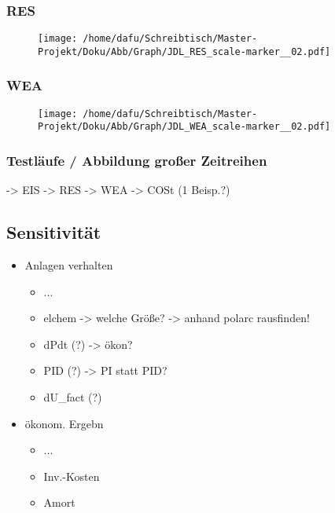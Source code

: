 \documentclass[onecolumn,10pt,titlepage]{article}
\begin{document}
\subsubsection{RES}
\begin{figure}[h]
	
	\centering
	\texttt{[image: /home/dafu/Schreibtisch/Master-Projekt/Doku/Abb/Graph/JDL\_RES\_scale-marker\_\_02.pdf]}
	\caption{ }
	\label{fig:Skal_RES} 
\end{figure}
\subsubsection{WEA}
\begin{figure}[h]
	
	\centering
	\texttt{[image: /home/dafu/Schreibtisch/Master-Projekt/Doku/Abb/Graph/JDL\_WEA\_scale-marker\_\_02.pdf]}
	\caption{ }
	\label{fig:Skal_WEA} 
\end{figure}

\subsubsection{Testläufe / Abbildung großer Zeitreihen}
-> EIS
-> RES
-> WEA
-> COSt (1 Beisp.?)

\subsection{Sensitivität}
\begin{itemize}
	\item Anlagen verhalten
	\begin{itemize}
		\item ...
		\item elchem -> welche Größe? -> anhand polarc rausfinden!
		\item dPdt (?) -> ökon?
		\item PID (?) -> PI statt PID? 
		\item dU\_fact (?)
	\end{itemize}
	\item ökonom. Ergebn
	\begin{itemize}
		\item ...
		\item Inv.-Kosten
		\item Amort
	\end{itemize}
\end{itemize}
\end{document}
